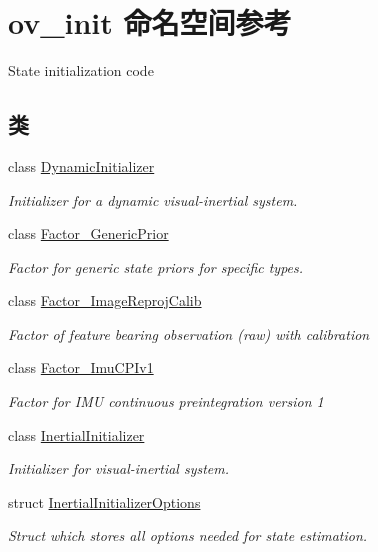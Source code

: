 \hypertarget{namespaceov__init}{}\section{ov\+\_\+init 命名空间参考}
\label{namespaceov__init}


State initialization code  


\subsection*{类}
\begin{DoxyCompactItemize}
\item 
class \hyperlink{classov__init_1_1DynamicInitializer}{Dynamic\+Initializer}
\begin{DoxyCompactList}\small\item\em Initializer for a dynamic visual-\/inertial system. \end{DoxyCompactList}\item 
class \hyperlink{classov__init_1_1Factor__GenericPrior}{Factor\+\_\+\+Generic\+Prior}
\begin{DoxyCompactList}\small\item\em Factor for generic state priors for specific types. \end{DoxyCompactList}\item 
class \hyperlink{classov__init_1_1Factor__ImageReprojCalib}{Factor\+\_\+\+Image\+Reproj\+Calib}
\begin{DoxyCompactList}\small\item\em Factor of feature bearing observation (raw) with calibration \end{DoxyCompactList}\item 
class \hyperlink{classov__init_1_1Factor__ImuCPIv1}{Factor\+\_\+\+Imu\+C\+P\+Iv1}
\begin{DoxyCompactList}\small\item\em Factor for I\+MU continuous preintegration version 1 \end{DoxyCompactList}\item 
class \hyperlink{classov__init_1_1InertialInitializer}{Inertial\+Initializer}
\begin{DoxyCompactList}\small\item\em Initializer for visual-\/inertial system. \end{DoxyCompactList}\item 
struct \hyperlink{structov__init_1_1InertialInitializerOptions}{Inertial\+Initializer\+Options}
\begin{DoxyCompactList}\small\item\em Struct which stores all options needed for state estimation. \end{DoxyCompactList}\item 

\end{DoxyCompactItemize}
